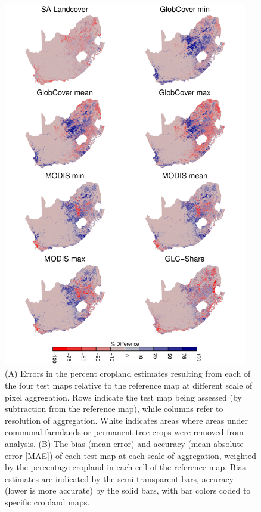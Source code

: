 \documentclass{pnastwo}
\begin{document}
\begin{article}
\begin{figure}[t]
\centerline{\includegraphics[width=0.95\textwidth]{figures/figure1.pdf}}
\vspace{-0.15 cm}
\caption{(A) Errors in the percent cropland estimates resulting from each of the four test maps relative to the reference map at different scale of pixel aggregation. Rows indicate the test map being assessed (by subtraction from the reference map), while columns refer to resolution of aggregation. White indicates areas where areas under communal farmlands or permanent tree crops were removed from analysis. (B) The bias (mean error) and accuracy (mean absolute error [MAE]) of each test map at each scale of aggregation, weighted by the percentage cropland in each cell of the reference map. Bias estimates are indicated by the semi-transparent bars, accuracy (lower is more accurate) by the solid bars, with bar colors coded to specific cropland maps.}
\label{afoto1}
\end{figure}


\end{article}
\end{document}
